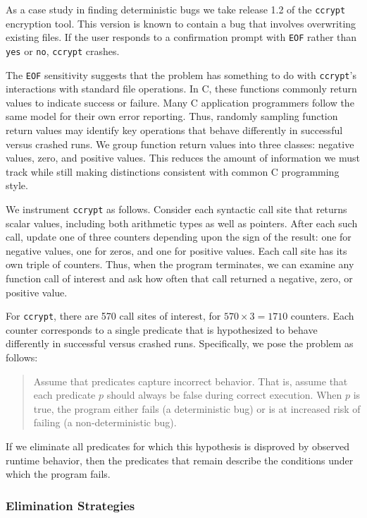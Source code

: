 As a case study in finding deterministic bugs we take release 1.2 of
the \texttt{ccrypt} encryption tool.  This version is known to contain
a bug that involves overwriting existing files.  If the user responds to
a confirmation prompt with
\texttt{EOF} rather than \texttt{yes} or \texttt{no}, \texttt{ccrypt}
crashes.

The \texttt{EOF} sensitivity suggests that the problem has something to do with
\texttt{ccrypt}'s interactions with standard file operations.
In C, these functions commonly return values to indicate
success or failure.  Many C application programmers follow the same
model for their own error reporting.  Thus, randomly sampling function
return values may identify key operations that behave differently in
successful versus crashed runs.  We group function return values into
three classes: negative values, zero, and positive values.  This
reduces the amount of information we must track while still making
distinctions consistent with common C programming style.

We instrument \texttt{ccrypt} as follows.
Consider each syntactic call site that returns
scalar values, including both arithmetic types as well as pointers.
After each such call, update one of three counters depending upon the
sign of the result: one for negative values, one for zeros, and one
for positive values.  Each call site has its own triple of counters.
Thus, when the program terminates, we can examine any function call of
interest and ask how often that call returned a negative, zero, or
positive value.  

For \texttt{ccrypt}, there are 570 call sites of interest, for $570 \times 3 =
1710$ counters.  Each counter corresponds to a single predicate that
is hypothesized to behave differently in successful versus crashed
runs.  Specifically, we pose the problem as follows:
\begin{quote}
  Assume that predicates capture incorrect behavior.  That is, assume
  that each predicate $p$ should always be false during correct
  execution.  When $p$ is true, the program either fails (a deterministic
bug) or is at
  increased risk of failing (a non-deterministic bug).
\end{quote}

If we eliminate all predicates for which this hypothesis is disproved
by observed runtime behavior, then the predicates that remain
describe the conditions under which the program fails.

\subsubsection{Elimination Strategies}

